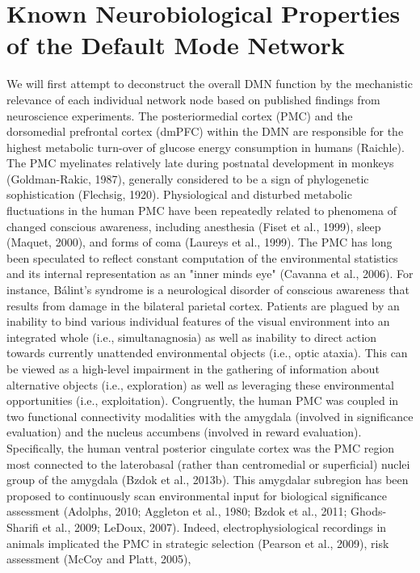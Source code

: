 \documentclass{article} %
\begin{document}
\section{Known Neurobiological Properties of the Default Mode Network}
We will first attempt to deconstruct the overall DMN function
by the mechanistic relevance of each individual network node
based on published findings from neuroscience experiments.
%
The posteriormedial cortex (PMC) and
the dorsomedial prefrontal cortex (dmPFC) within the DMN
are responsible for the highest metabolic turn-over
of glucose energy consumption in humans (Raichle).
The PMC myelinates relatively late during postnatal development in monkeys
(Goldman-Rakic, 1987), generally considered to
be a sign of phylogenetic sophistication (Flechsig, 1920).
Physiological and disturbed metabolic fluctuations in the
human PMC have been repeatedly related to
phenomena of changed conscious awareness,
including anesthesia (Fiset et al., 1999),
sleep (Maquet, 2000), and forms of coma (Laureys et al., 1999).
%
The PMC has long been speculated to reflect constant computation of
the environmental statistics and its internal representation
as an "inner minds eye" (Cavanna et al., 2006).
For instance, B\'alint's syndrome is a neurological disorder of conscious
awareness that results from damage in the bilateral parietal cortex.
Patients are plagued by an
inability to bind various individual features of the visual
environment into an integrated whole (i.e., simultanagnosia)
as well as inability to direct action towards
currently unattended environmental objects
(i.e., optic ataxia).
This can be viewed as a high-level impairment in the gathering
of information about alternative objects (i.e., exploration) as well as
leveraging these environmental opportunities (i.e., exploitation).
Congruently,
the human PMC was coupled in two functional connectivity modalities
with the amygdala
(involved in significance evaluation) and
the nucleus accumbens (involved in reward evaluation).
Specifically, the human ventral posterior cingulate cortex was
the PMC region most connected to the laterobasal
(rather than centromedial or superficial) nuclei group
of the amygdala (Bzdok et al., 2013b).
This amygdalar subregion has been proposed to
continuously scan environmental input
for biological significance assessment
(Adolphs, 2010; Aggleton et al., 1980; Bzdok et al., 2011;
Ghods-Sharifi et al., 2009; LeDoux, 2007).
%
Indeed,
electrophysiological recordings in animals implicated the PMC in
strategic selection (Pearson et al., 2009), risk assessment (McCoy and Platt, 2005),
\end{document}
